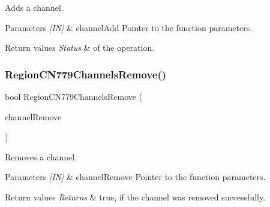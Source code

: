 Adds a channel. 


\begin{DoxyParams}{Parameters}
{\em \mbox{[}\+I\+N\mbox{]}} & channel\+Add Pointer to the function parameters.\\
\hline
\end{DoxyParams}

\begin{DoxyRetVals}{Return values}
{\em Status} & of the operation. \\
\hline
\end{DoxyRetVals}
\mbox{\label{group__REGIONCN779_ga3ea3d4f5fe7cb25f562f4e6f95396eed}} 
\subsubsection{\texorpdfstring{Region\+C\+N779\+Channels\+Remove()}{RegionCN779ChannelsRemove()}}
{\footnotesize\ttfamily bool Region\+C\+N779\+Channels\+Remove (\begin{DoxyParamCaption}\item[{\hyperlink{group__REGION_gaa37468560d2fc81a977b57a48e5d72c0}{Channel\+Remove\+Params\+\_\+t} $\ast$}]{channel\+Remove }\end{DoxyParamCaption})}



Removes a channel. 


\begin{DoxyParams}{Parameters}
{\em \mbox{[}\+I\+N\mbox{]}} & channel\+Remove Pointer to the function parameters.\\
\hline
\end{DoxyParams}

\begin{DoxyRetVals}{Return values}
{\em Returns} & true, if the channel was removed successfully. \\
\hline
\end{DoxyRetVals}
\mbox{\label{group__REGIONCN779_ga4f354a88e5bfee44eccaad7d2e18c87e}} 
